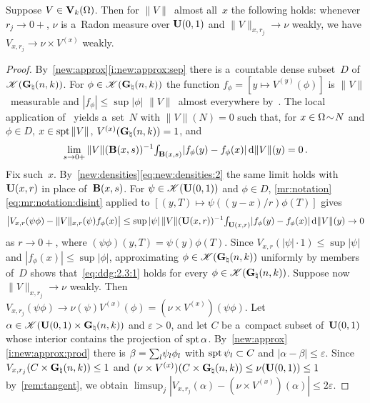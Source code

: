 \documentclass[a4paper,twoside,leqno]{article}
\newcommand{\Gk}{\pgrass{\adim}{\vdim}}        %
\begin{document}
\begin{lemma}
    \label{ddg:2.3}
    Suppose $V \in \mathbf{V}_{k}(\Omega)$. Then for $\|V\|$~almost all~$x$ the following holds:
    whenever $r_j \to 0+$, $\nu$ is a~Radon measure over $\mathbf{U}(0,1)$ and $\|V\|_{x,r_j} \to
    \nu$ weakly, we have $V_{x,r_j} \to \nu \times V^{(x)}$ weakly.
\end{lemma}

\begin{proof}
    By~\ref{new:approx}\ref{i:new:approx:sep} there is a~countable dense subset~$D$
    of~$\ccspace{\Gk}$. For $\phi \in \ccspace{\Gk}$ the function $f_\phi = [ y \mapsto
    V^{(y)}(\phi) ]$ is $\|V\|$~measurable and $|f_\phi| \le \sup |\phi|$ $\|V\|$~almost
    everywhere by~\cite[3.3]{Allard1972}. The local application of~\cite[2.8.18,
    2.9.9]{Federer1969} yields a~set~$N$ with $\|V\|(N) = 0$ such that, for $x \in \Omega
    \!\sim\! N$ and $\phi \in D$, $x \in \operatorname{spt} \|V\|$, $V^{(x)}(\Gk) = 1$, and
    \begin{displaymath}
        \lim_{s \to 0+} \|V\|(\mathbf{B}(x,s))^{-1} {\textstyle\int_{\mathbf{B}(x,s)}^{}} |f_\phi(y) - f_\phi(x)|
        \,\mathrm{d} \|V\|(y) = 0 \,.
    \end{displaymath}
    Fix such~$x$. By~\ref{new:densities}\eqref{eq:new:densities:2} the same limit holds with
    $\mathbf{U}(x,r)$ in place of~$\mathbf{B}(x,s)$. For $\psi \in \mathscr{K}(\mathbf{U}(0,1))$ and $\phi
    \in D$, \ref{mr:notation}\eqref{eq:mr:notation:disint} applied to $[ (y,T) \mapsto
    \psi((y-x)/r) \phi(T) ]$ gives
    \begin{equation}
        \label{eq:ddg:2.3:1}
        \bigl| V_{x,r}(\psi \phi) - \|V\|_{x,r}(\psi) f_\phi(x) \bigr| \le \sup |\psi| \,
        \|V\|(\mathbf{U}(x,r))^{-1} {\textstyle\int_{\mathbf{U}(x,r)}^{}} |f_\phi(y) - f_\phi(x)| \,\mathrm{d} \|V\|(y) \to 0
    \end{equation}
    as $r \to 0+$, where $(\psi\phi)(y,T) = \psi(y)\phi(T)$. Since $V_{x,r}(|\psi| \cdot 1) \le
    \sup |\psi|$ and $|f_\phi(x)| \le \sup|\phi|$, approximating $\phi \in \ccspace{\Gk}$
    uniformly by members of~$D$ shows that~\eqref{eq:ddg:2.3:1} holds for every $\phi \in
    \ccspace{\Gk}$. Suppose now $\|V\|_{x,r_j} \to \nu$ weakly. Then $V_{x,r_j}(\psi \phi) \to
    \nu(\psi) V^{(x)}(\phi) = (\nu \times V^{(x)})(\psi\phi)$. Let $\alpha \in
    \ccspace{\oball{0}{1} \times \Gk}$ and $\varepsilon > 0$, and let $C$ be a~compact subset
    of~$\mathbf{U}(0,1)$ whose interior contains the projection of $\operatorname{spt} \alpha$.
    By~\ref{new:approx}\ref{i:new:approx:prod} there is $\beta = {\textstyle\sum_{l}^{}} \psi_l \phi_l$ with
    $\operatorname{spt} \psi_l \subset C$ and $|\alpha - \beta| \le \varepsilon$. Since $V_{x,r_j}(C \times
    \Gk) \le 1$ and $(\nu \times V^{(x)})(C \times \Gk) \le \nu(\oball{0}{1}) \le 1$
    by~\ref{rem:tangent}, we obtain $\limsup_j |V_{x,r_j}(\alpha) - (\nu \times
    V^{(x)})(\alpha)| \le 2 \varepsilon$.
\end{proof}
\end{document}
